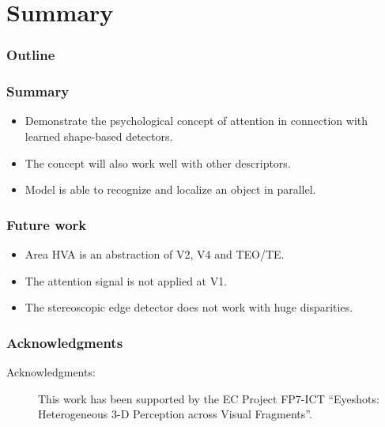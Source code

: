 \documentclass[12]{beamer}
\begin{document}
\section{Summary}
%
\begin{frame}
  \frametitle{Outline}
  \tableofcontents[currentsection]
\end{frame}
%
\begin{frame}
  \frametitle<presentation>{Summary}
	\begin{itemize}
		\item Demonstrate the psychological concept of attention in connection with learned shape-based detectors.
		\item The concept will also work well with other descriptors.
		\item Model is able to recognize and localize an object in parallel.  	
	\end{itemize}
\end{frame}
%
\begin{frame}
 	\frametitle{Future work}
	\begin{itemize}
	  \item Area HVA is an abstraction of V2, V4 and TEO/TE.
	  \item The attention signal is not applied at V1.
	  \item The stereoscopic edge detector does not work with huge disparities.
	\end{itemize}
\end{frame}


%
\LARGE
\begin{frame}
	\frametitle{Acknowledgments}

\begin{figure}
\end{figure}
\small
\begin{description}
  \item [Acknowledgments:] This work has been supported by the EC Project FP7-ICT ``Eyeshots: Heterogeneous 3-D Perception across Visual Fragments''.	
\end{description}

\end{frame}
\end{document}
